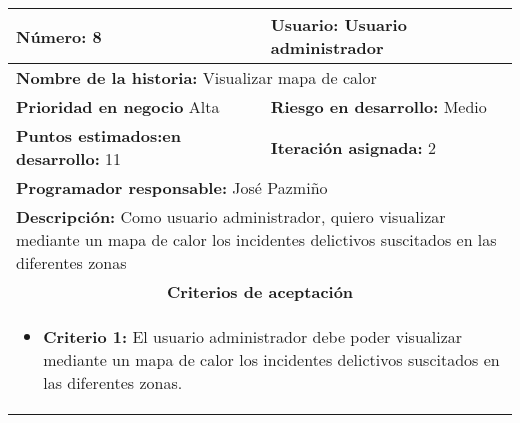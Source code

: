\begin{longtable}{|p{6.7cm}|p{6.7cm}|}
    \textbf{Número:} 8                                   & \textbf{Usuario:} Usuario administrador                                                                                           \\
    \hline
    \multicolumn{2}{|l|}{\textbf{Nombre de la historia:} Visualizar mapa de calor}                                                                                                           \\
    \hline
    \textbf{Prioridad en negocio}  Alta                  & \textbf{Riesgo en desarrollo:} Medio                                                                                              \\
    \hline
    \textbf{\textbf{Puntos estimados:}en desarrollo:} 11 & \textbf{Iteración asignada:} 2                                                                                                    \\
    \hline
    \multicolumn{2}{|l|}{\textbf{Programador responsable:} José Pazmiño }                                                                                                                    \\
    \hline
    \multicolumn{2}{|p{13.4cm}|}{\textbf{Descripción:} Como usuario administrador, quiero visualizar mediante un mapa de calor los incidentes delictivos suscitados en las diferentes zonas} \\
    \hline
    \multicolumn{2}{|c|}{\textbf{Criterios de aceptación}}                                                                                                                                   \\
    \hline
    \multicolumn{2}{|p{13.4cm}|}{
    \begin{itemize}[label={},leftmargin=*, nosep]
        \item \textbf{Criterio 1:} El usuario administrador debe poder visualizar mediante un mapa de calor los incidentes delictivos suscitados en las diferentes zonas.
    \end{itemize}
    }                                                                                                                                                                                        \\
\end{longtable}




